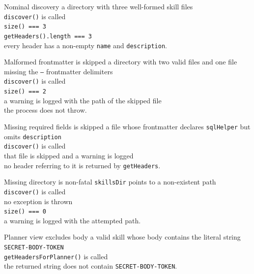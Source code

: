 \begin{scenario}{Nominal discovery}
\Given a directory with three well-formed skill files \\
\When \texttt{discover()} is called \\
\Then \texttt{size() === 3} \\
\And \texttt{getHeaders().length === 3} \\
\And every header has a non-empty \texttt{name} and \texttt{description}.
\end{scenario}

\begin{scenario}{Malformed frontmatter is skipped}
\Given a directory with two valid files and one file missing the \texttt{---} frontmatter delimiters \\
\When \texttt{discover()} is called \\
\Then \texttt{size() === 2} \\
\And a warning is logged with the path of the skipped file \\
\And the process does not throw.
\end{scenario}

\begin{scenario}{Missing required fields is skipped}
\Given a file whose frontmatter declares \texttt{sqlHelper} but omits \texttt{description} \\
\When \texttt{discover()} is called \\
\Then that file is skipped and a warning is logged \\
\And no header referring to it is returned by \texttt{getHeaders}.
\end{scenario}

\begin{scenario}{Missing directory is non-fatal}
\Given \texttt{skillsDir} points to a non-existent path \\
\When \texttt{discover()} is called \\
\Then no exception is thrown \\
\And \texttt{size() === 0} \\
\And a warning is logged with the attempted path.
\end{scenario}

\begin{scenario}{Planner view excludes body}
\Given a valid skill whose body contains the literal string \texttt{SECRET-BODY-TOKEN} \\
\When \texttt{getHeadersForPlanner()} is called \\
\Then the returned string does not contain \texttt{SECRET-BODY-TOKEN}.
\end{scenario}

